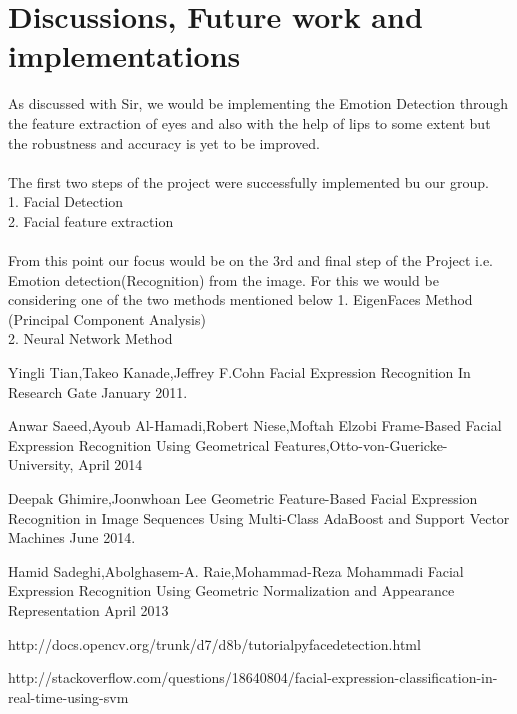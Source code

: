 \documentclass[journal]{IEEEtran}
\begin{document}
\section{Discussions, Future work and implementations}
As discussed with Sir, we would be implementing the Emotion Detection through the feature extraction of eyes and also with the help of lips to some extent but the robustness and accuracy is yet to be improved.\\ \\
The first two steps of the project were successfully implemented bu our group.\\
1. Facial Detection\\ 2. Facial feature extraction\\ \\
From this point our focus would be on the 3rd and final step of the Project i.e. Emotion detection(Recognition) from the image. For this we would be considering one of the two methods mentioned below
1. EigenFaces Method (Principal Component Analysis)\\
2. Neural Network Method



\ifCLASSOPTIONcaptionsoff
  \newpage
\fi


\begin{thebibliography}{1}
Yingli Tian,Takeo Kanade,Jeffrey F.Cohn Facial Expression Recognition In Research Gate January 2011.

Anwar Saeed,Ayoub Al-Hamadi,Robert Niese,Moftah Elzobi Frame-Based Facial Expression Recognition Using Geometrical Features,Otto-von-Guericke-University, April 2014

Deepak Ghimire,Joonwhoan Lee Geometric Feature-Based Facial Expression Recognition in Image Sequences Using Multi-Class AdaBoost and Support Vector Machines June 2014. 

Hamid Sadeghi,Abolghasem-A. Raie,Mohammad-Reza Mohammadi Facial Expression Recognition Using Geometric Normalization and Appearance Representation April 2013 

http://docs.opencv.org/trunk/d7/d8b/tutorial\textunderscore py\textunderscore face\textunderscore detection.html

http://stackoverflow.com/questions/18640804/facial-expression-classification-in-real-time-using-svm

\end{thebibliography}



\end{document}
